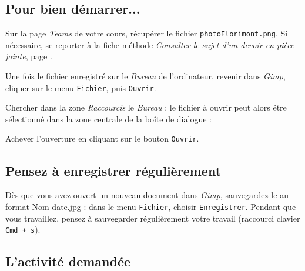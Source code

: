 \subsection{Pour bien démarrer...}

Sur la page \emph{Teams} de votre cours, récupérer le fichier \texttt{photoFlorimont.png}. Si nécessaire, se reporter à la fiche méthode \emph{Consulter le sujet d'un devoir en pièce jointe}, page \pageref{consulterDevoir}.

Une fois le fichier enregistré sur le \emph{Bureau} de l'ordinateur, revenir dans \emph{Gimp}, cliquer sur le menu \texttt{Fichier}, puis \texttt{Ouvrir}.


Chercher dans la zone \emph{Raccourcis} le \emph{Bureau} : le fichier à ouvrir peut alors être sélectionné dans la zone centrale de la boîte de dialogue :


Achever l'ouverture en cliquant sur le bouton \texttt{Ouvrir}.

\subsection{Pensez à enregistrer régulièrement}

Dès que vous avez ouvert un nouveau document dans \emph{Gimp}, sauvegardez-le au format Nom-date.jpg : dans le menu \texttt{Fichier}, choisir \texttt{Enregistrer}. Pendant que vous travaillez, pensez à sauvegarder régulièrement votre travail (raccourci clavier \texttt{Cmd + s}).   




\subsection{L'activité demandée}

\vspace{10pt}


